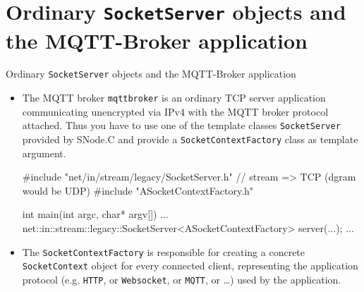 \section[nosectionpage]{Ordinary \texttt{SocketServer} objects and the MQTT-Broker application}

\begin{frame}[fragile]{Ordinary \texttt{SocketServer} objects and the MQTT-Broker application}
  \begin{itemize}
    \item The MQTT broker \texttt{\alert{mqttbroker}} is an ordinary \alert{TCP server} application communicating \alert{unencrypted} via \alert{IPv4} with the MQTT broker protocol attached.
    Thus you have to use one of the \alert{template classes \texttt{SocketServer}} provided by SNode.C and provide a \texttt{\alert{SocketContextFactory}} class as \alert{template argument}.

    \begin{cppcode}[gobble=4]
      #include "net/in/stream/legacy/SocketServer.h" // stream => TCP (dgram would be UDP)
      #include "ASocketContextFactory.h"

      int main(int argc, char* argv[]) {
        ...
        net::in::stream::legacy::SocketServer<ASocketContextFactory> server(...);
        ...
      }
    \end{cppcode}
    \item The \texttt{\alert{SocketContextFactory}} is responsible for \alert{creating} a concrete \texttt{\alert{SocketContext}} object for \alert{every connected client}, \alert{representing} the \alert{application protocol} (e.g. \texttt{\alert{HTTP}}, or \texttt{\alert{Websocket}}, or \texttt{\alert{MQTT}}, or \ldots) used by the application.
  \end{itemize}
\end{frame}
